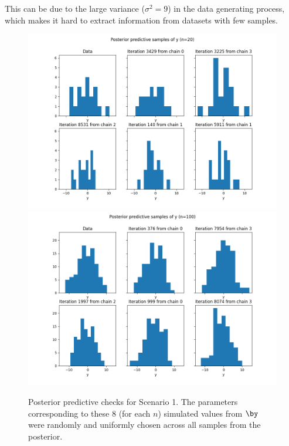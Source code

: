 \documentclass[a4paper, 10pt]{article}
\begin{document}
This can be due to the large variance ($ \sigma^2 = 9 $) in the data generating process, which makes it hard to extract information from datasets with few samples.
\begin{figure}[htb]
    \begin{center}
        \includegraphics[height=.5\textwidth]{../outputs/artificial_scenarios_n=20/scenario_1/posterior_predictive_check.png}
        \includegraphics[height=.5\textwidth]{../outputs/artificial_scenarios_n=100/scenario_1/posterior_predictive_check.png}
    \end{center}
    \caption[Posterior predictive checks for Scenario 1.]{Posterior predictive checks for Scenario 1. The parameters corresponding to these $ 8 $ (for each $ n $) simulated values from $ \by $ were randomly and uniformly chosen across all samples from the posterior.}
    \label{fig: posterior predictive check scenario 1}
\end{figure}
\end{document}
